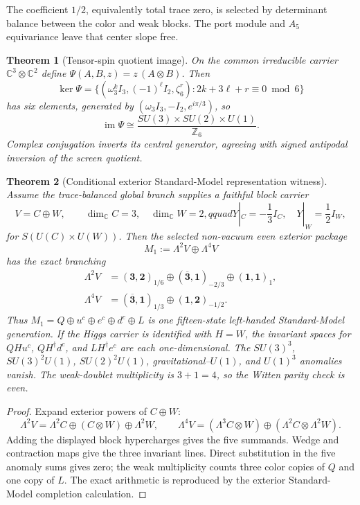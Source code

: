 \documentclass[11pt]{article}
\newtheorem{theorem}{Theorem}[section]
\begin{document}
The coefficient \(1/2\), equivalently total trace zero, is selected by
determinant balance between the color and weak blocks. The port module and \(A_5\)
equivariance leave that center slope free.

\begin{theorem}[Tensor-spin quotient image]
On the common irreducible carrier \(\mathbb C^3\otimes\mathbb C^2\) define
\(\Psi(A,B,z)=z\,(A\otimes B)\). Then
\[
  \ker\Psi=\bigl\{(\omega_3^kI_3,(-1)^\ell I_2,\zeta_6^r):
  2k+3\ell+r\equiv0 \bmod 6\bigr\}
\]
has six elements, generated by \((\omega_3I_3,-I_2,e^{i\pi/3})\), so
\[
  \operatorname{im}\Psi\cong
  \frac{SU(3)\times SU(2)\times U(1)}{\mathbb Z_6}.
\]
Complex conjugation inverts its central generator, agreeing with signed
antipodal inversion of the screen quotient.
\end{theorem}

\begin{theorem}[Conditional exterior Standard-Model representation witness]
\label{thm:screen-exterior-sm-witness}
Assume the trace-balanced global branch supplies a faithful block carrier
\[
V=C\oplus W,\qquad \dim_{\mathbb C}C=3,\quad
\dim_{\mathbb C}W=2,qquad
Y|_C=-\frac13 I_C,\quad Y|_W=\frac12 I_W,
\]
for \(S(U(C)\times U(W))\). Then the selected non-vacuum even exterior
package
\[
M_1:=\Lambda^2V\oplus\Lambda^4V
\]
has the exact branching
\[
\begin{aligned}
\Lambda^2V&=(\mathbf3,\mathbf2)_{1/6}
\oplus(\overline{\mathbf3},\mathbf1)_{-2/3}
\oplus(\mathbf1,\mathbf1)_1,\\
\Lambda^4V&=(\overline{\mathbf3},\mathbf1)_{1/3}
\oplus(\mathbf1,\mathbf2)_{-1/2}.
\end{aligned}
\]
Thus \(M_1=Q\oplus u^c\oplus e^c\oplus d^c\oplus L\) is one
fifteen-state left-handed Standard-Model generation. If the Higgs carrier is
identified with \(H=W\), the invariant spaces for
\(QHu^c\), \(QH^\dagger d^c\), and \(LH^\dagger e^c\) are each
one-dimensional. The \(SU(3)^3\), \(SU(3)^2U(1)\), \(SU(2)^2U(1)\),
gravitational--\(U(1)\), and \(U(1)^3\) anomalies vanish. The weak-doublet
multiplicity is \(3+1=4\), so the Witten parity check is even.
\end{theorem}

\begin{proof}
Expand exterior powers of \(C\oplus W\):
\[
\Lambda^2V=\Lambda^2C\oplus(C\otimes W)\oplus\Lambda^2W,
\qquad
\Lambda^4V=(\Lambda^3C\otimes W)
\oplus(\Lambda^2C\otimes\Lambda^2W).
\]
Adding the displayed block hypercharges gives the five summands. Wedge and
contraction maps give the three invariant lines. Direct substitution in the
five anomaly sums gives zero; the weak multiplicity counts three color copies
of \(Q\) and one copy of \(L\). The exact arithmetic is reproduced by the
exterior Standard-Model completion calculation.
\end{proof}
\end{document}
